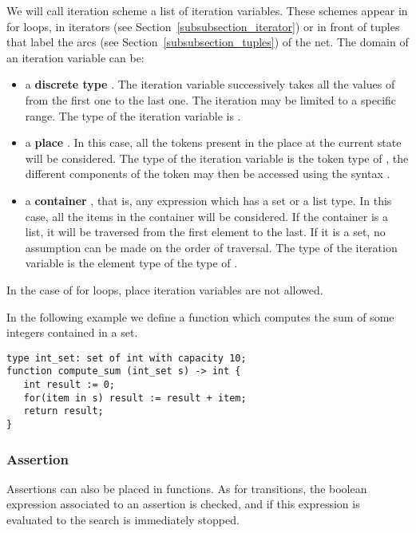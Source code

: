  We will call iteration scheme a list of
iteration variables.  These schemes appear in for loops, in iterators
(see Section~\ref{subsubsection_iterator}) or in front of tuples that
label the arcs (see Section~\ref{subsubsection_tuples}) of the net.
The domain of an iteration variable  can be:
\begin{itemize}
\item
  a {\bf discrete type} .  The iteration variable successively
  takes all the values of  from the first one to the last one.
  The iteration may be limited to a specific range.  The type of the
  iteration variable is .
\item
  a {\bf place} .  In this case, all the tokens present in the
  place at the current state will be considered.  The type of the
  iteration variable is the token type of , the different
  components of the token may then be accessed using the syntax
  .
\item
  a {\bf container} , that is, any expression which has a set or
  a list type.  In this case, all the items in the container will be
  considered.  If the container is a list, it will be traversed from
  the first element to the last.  If it is a set, no assumption can be
  made on the order of traversal.  The type of the iteration variable
  is the element type of the type of .
\end{itemize}
In the case of for loops, place iteration variables are not allowed.

In the following example we define a function 
which computes the sum of some integers contained in a set.
\begin{lstlisting}
type int_set: set of int with capacity 10;
function compute_sum (int_set s) -> int {
   int result := 0;
   for(item in s) result := result + item;
   return result;
}
\end{lstlisting}

\fordef


\subsubsection{Assertion}
Assertions can also be placed in functions.  As for transitions, the
boolean expression associated to an assertion is checked, and if this
expression is evaluated to  the search is immediately
stopped.\\

\assertstatdef




